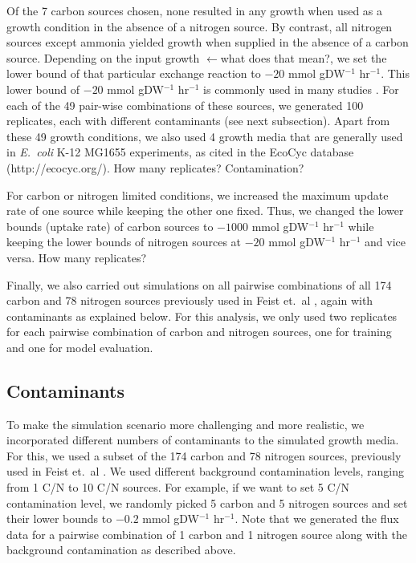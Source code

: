 \documentclass[12pt]{article}
\begin{document}
Of the 7 carbon sources chosen, none resulted in any growth when used as a growth condition in the absence of a nitrogen source. By contrast, all nitrogen sources except ammonia yielded growth when supplied in the absence of a carbon source. Depending on the input growth {\color{red}$\leftarrow$what does that mean?}, we set the lower bound of that particular exchange reaction to $-20$ mmol gDW$^{-1}$ hr$^{-1}$. This lower bound of $-20$ mmol gDW$^{-1}$ hr$^{-1}$ is commonly used in many studies \cite{Feistetal2007}. For each of the 49 pair-wise combinations of these sources, we generated 100 replicates, each with different contaminants (see next subsection). Apart from these 49 growth conditions, we also used 4 growth media that are generally used in \emph{E.\ coli} K-12 MG1655 experiments, as cited in the EcoCyc database (http://ecocyc.org/). {\color{red}How many replicates? Contamination?}

For carbon or nitrogen limited conditions, we increased the maximum update rate of one source while keeping the other one fixed. Thus, we changed the lower bounds (uptake rate) of carbon sources to $-1000$ mmol gDW$^{-1}$ hr$^{-1}$ while keeping the lower bounds of nitrogen sources at $-20$ mmol gDW$^{-1}$ hr$^{-1}$ and vice versa. {\color{red}How many replicates?}

Finally, we also carried out simulations on all pairwise combinations of all 174 carbon and 78 nitrogen sources previously used in Feist et.\ al \cite{Feistetal2007}, again with contaminants as explained below. For this analysis, we only used two replicates for each pairwise combination of carbon and nitrogen sources, one for training and one for model evaluation.

\subsection*{Contaminants}
To make the simulation scenario more challenging and more realistic, we incorporated different numbers of contaminants to the simulated growth media. For this, we used a subset of the 174 carbon and 78 nitrogen sources, previously used in Feist et.\ al \cite{Feistetal2007}.  We used different background contamination levels, ranging from 1 C/N to 10 C/N sources. For example, if we want to set 5 C/N contamination level, we randomly picked 5 carbon and 5 nitrogen sources and set their lower bounds to $-0.2$ mmol gDW$^{-1}$ hr$^{-1}$. Note that we generated the flux data for a pairwise combination of 1 carbon and 1 nitrogen source along with the background contamination as described above. 
\end{document}
